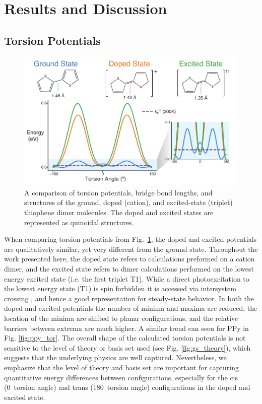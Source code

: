 \section{Results and Discussion}
\subsection{Torsion Potentials}

\begin{figure}[hbt!]
    \centering
    \includegraphics{figures/chap2/tor_compare.pdf}
    \caption[Comparison of the Ground, Doped, and Excited-state Torsion Potentials]{A comparison of torsion potentials, bridge bond lengths, and structures of the ground, doped (cation), and excited-state (triplet) thiophene dimer molecules. The doped and excited states are represented as quinoidal structures.}
    \label{fig:comp_tor}
\end{figure}

When comparing torsion potentials from Fig.~\ref{fig:comp_tor}, the doped and excited potentials are qualitatively similar, yet very different from the ground state. Throughout the work presented here, the doped state refers to calculations preformed on a cation dimer, and the excited state refers to dimer calculations performed on the lowest energy excited state (i.e. the first triplet T1). While a direct photoexcitation to the lowest energy state (T1) is spin forbidden it is accessed via intersystem crossing \cite{Beljonne2001, Banerji2011, Kolle2016}, and hence a good representation for steady-state behavior. In both the doped and excited potentials the number of minima and maxima are reduced, the location of the minima are shifted to planar configurations, and the relative barriers between extrema are much higher. A similar trend can seen for PPy in Fig. \ref{fig:ppy_tor}. The overall shape of the calculated torsion potentials is not sensitive to the level of theory or basis set used (see Fig. \ref{fig:gs_theory}), which suggests that the underlying physics are well captured. Nevertheless, we emphasize that the level of theory and basis set are important for capturing quantitative energy differences between configurations, especially for the cis (0\textdegree \ torsion angle) and trans (180\textdegree \ torsion angle) configurations in the doped and excited state.

